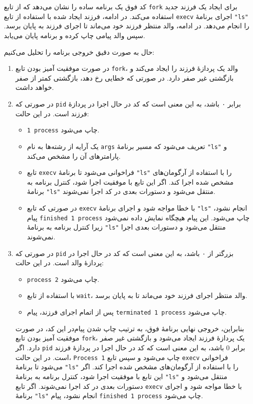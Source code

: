 \begin{qsolve}
	کد فوق یک برنامه ساده را نشان می‌دهد که از تابع \texttt{fork} برای ایجاد یک فرزند جدید استفاده می‌کند. در ادامه، فرزند ایجاد شده با استفاده از تابع \texttt{execv} اجرای برنامهٔ \texttt{"ls"} را انجام می‌دهد. در ادامه، والد منتظر فرزند خود می‌ماند تا اجرای فرزند به پایان برسد. سپس والد پیامی چاپ کرده و برنامه پایان می‌یابد.
	
	حال به صورت دقیق خروجی برنامه را تحلیل می‌کنیم:
	\begin{enumerate}
		\item در صورت موفقیت آمیز بودن تابع \texttt{fork}، والد یک پردازهٔ فرزند را ایجاد می‌کند و بازگشتی غیر صفر دارد. در صورتی که خطایی رخ دهد، بازگشتی کمتر از صفر خواهد داشت.
		
		\item در صورتی که \texttt{pid} برابر ۰ باشد، به این معنی است که کد در حال اجرا در پردازهٔ فرزند است. در این حالت:
		\begin{itemize}
			\item \texttt{1 process} چاپ می‌شود.
			\item یک آرایه از رشته‌ها به نام \texttt{args} تعریف می‌شود که مسیر برنامهٔ \texttt{"ls"} و پارامترهای آن را مشخص می‌کند.
			\item تابع \texttt{execv} فراخوانی می‌شود تا برنامهٔ \texttt{"ls"} را با استفاده از آرگومان‌های مشخص شده اجرا کند. اگر این تابع با موفقیت اجرا شود، کنترل برنامه به برنامهٔ \texttt{"ls"} منتقل می‌شود و دستورات بعدی در کد اجرا نمی‌شوند.
			\item در صورتی که تابع \texttt{execv} با خطا مواجه شود و اجرای برنامهٔ \texttt{"ls"} انجام نشود، پیام \texttt{finished 1 process} چاپ می‌شود. این پیام هیچگاه نمایش داده نمی‌شود زیرا کنترل برنامه به برنامهٔ \texttt{"ls"} منتقل می‌شود و دستورات بعدی اجرا نمی‌شوند.
		\end{itemize}
		
		\item در صورتی که \texttt{pid} بزرگتر از ۰ باشد، به این معنی است که کد در حال اجرا در پردازهٔ والد است. در این حالت:
		\begin{itemize}
			\item \texttt{process 2} چاپ می‌شود.
			\item با استفاده از تابع \texttt{wait}، والد منتظر اجرای فرزند خود می‌ماند تا به پایان برسد.
			\item پس از اتمام اجرای فرزند، پیام \texttt{terminated 1 process} چاپ می‌شود.
		\end{itemize}
		
		
بنابراین، خروجی نهایی برنامهٔ فوق، به ترتیب چاپ شدن پیام‌در این کد، در صورت موفقیت آمیز بودن تابع \texttt{fork}، یک پردازهٔ فرزند ایجاد می‌شود و بازگشتی غیر صفر دارد. اگر \texttt{pid} برابر 0 باشد، به این معنی است که کد در حال اجرا در پردازهٔ فرزند است. در این حالت، \texttt{Process 1} چاپ می‌شود و سپس تابع \texttt{execv} فراخوانی می‌شود تا برنامهٔ \texttt{"ls"} را با استفاده از آرگومان‌های مشخص شده اجرا کند. اگر این تابع با موفقیت اجرا شود، کنترل برنامه به برنامهٔ \texttt{"ls"} منتقل می‌شود و دستورات بعدی در کد اجرا نمی‌شوند. اگر تابع \texttt{execv} با خطا مواجه شود و اجرای برنامهٔ \texttt{"ls"} انجام نشود، پیام
 \texttt{finished 1 process} چاپ می‌شود.
		

\end{enumerate}
\end{qsolve}
